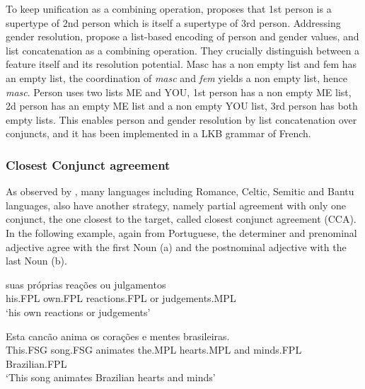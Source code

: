 \documentclass[output=paper]{langsci/langscibook}
\begin{document}
To keep unification as a combining operation, \citet{Sag:03} proposes that 1st person is a supertype of 2nd person which is itself a supertype of 3rd person. Addressing gender resolution, \citet{Aguila:Crysmann:18} propose a list-based encoding of person and gender values, and list concatenation as a combining operation. They crucially distinguish between a feature itself and its resolution potential. Masc has a non empty list and fem has an empty list, the coordination of \textit{masc} and \textit{fem} yields a non empty list, hence \textit{masc}. Person uses two lists ME and YOU, 1st person has a non empty ME list, 2d person has an empty ME list and a non empty YOU list, 3rd person has both empty lists. This enables person and gender resolution by list concatenation over conjuncts, and it has been implemented in a LKB grammar of French.

\subsubsection{Closest Conjunct agreement}

%

As observed by \citet{Corbet91}, many languages including Romance, Celtic, Semitic and Bantu languages, also have another strategy, namely partial agreement with only one conjunct, the one closest to the target, called closest conjunct agreement (CCA). 
In the following example, again from Portuguese, the determiner and prenominal adjective agree with the first Noun (a) and the postnominal adjective with the last Noun (b).

\begin{exe}
 \ex
\begin{xlista}
\ex \gll suas pr\'{o}prias rea\c{c}\~{o}es ou julgamentos \\
his.FPL own.FPL reactions.FPL or judgements.MPL \\
\glt `his own reactions or judgements'\\
\citep[435]{Villavicencio:Sadler:ea:05} 


\ex \gll Esta canc\~{a}o anima os cora\c{c}\~{o}es e mentes brasileiras. \\
 This.FSG  song.FSG animates the.MPL hearts.MPL and minds.FPL Brazilian.FPL \\
\glt `This song animates Brazilian hearts and minds'\\
\citep[437]{Villavicencio:Sadler:ea:05} 
\end{xlista}
\end{exe}
\end{document}
